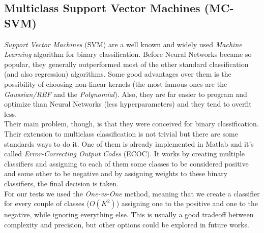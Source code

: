 \subsection{Multiclass Support Vector Machines (MC-SVM)}
\label{subsec:svm}

\textit{Support Vector Machines} (SVM) are a well known and widely used \textit{Machine Learning} algorithm for binary classification. Before Neural Networks became so popular, they generally outperformed most of the other standard classification (and also regression) algorithms. Some good advantages over them is the possibility of choosing non-linear kernels (the most famous ones are the \textit{Gaussian/RBF} and the \textit{Polynomial}). Also, they are far easier to program and optimize than Neural Networks (less hyperparameters) and they tend to overfit less.\\
%
Their main problem, though, is that they were conceived for binary classification. Their extension to multiclass classification is not trivial but there are some standards ways to do it. One of them is already implemented in Matlab and it's called \textit{Error-Correcting Output Codes} (ECOC). It works by creating multiple classifiers and assigning to each of them some classes to be considered positive and some other to be negative and by assigning weights to these binary classifiers, the final decision is taken.\\
%
For our tests we used the \textit{One-vs-One} method, meaning that we create a classifier for every couple of classes ($O(K^2)$) assigning one to the positive and one to the negative, while ignoring everything else. This is usually a good tradeoff between complexity and precision, but other options could be explored in future works.